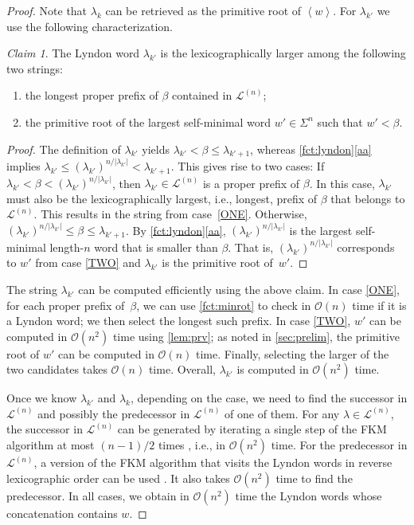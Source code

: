 \documentclass{article}
\newcommand{\Oh}{\mathcal{O}}
\renewcommand{\L}{{\mathcal{L}}}
\newcommand{\minrot}[1]{\left\langle #1 \right\rangle}
\theoremstyle{definition}
\theoremstyle{remark}
\newtheorem*{claim}{Claim}
\begin{document}
\begin{proof}
  Note that $\lambda_k$ can be retrieved as the primitive root of $\minrot{w}$. For $\lambda_{k'}$ we use the following characterization.
    \begin{claim}
      The Lyndon word $\lambda_{k'}$ is the lexicographically larger among the following two strings:
    \begin{enumerate}[label={(\arabic*)}]
    \item\label{ONE} the longest proper prefix of $\beta$ contained in $\L^{(n)}$;
    \item\label{TWO} the primitive root of the largest self-minimal word $w'\in \Sigma^n$ such that $w'<\beta$.
    \end{enumerate}
    \end{claim}
    \begin{proof}
  The definition of $\lambda_{k'}$ yields $\lambda_{k'} < \beta \le \lambda_{k'+1}$, whereas
    \cref{fct:lyndon}\ref{aa} implies $\lambda_{k'} \le (\lambda_{k'})^{n/|\lambda_{k'}|} < \lambda_{k'+1}$.
    This gives rise to two cases:
    If $\lambda_{k'} < \beta < (\lambda_{k'})^{n/|\lambda_{k'}|}$, then $\lambda_{k'} \in \L^{(n)}$ is a proper prefix of $\beta$.
    In this case, $\lambda_{k'}$ must also be the lexicographically largest, i.e., longest, prefix of $\beta$ that belongs to $\L^{(n)}$.
    This results in the string from case~\ref{ONE}.
    Otherwise, $(\lambda_{k'})^{n/|\lambda_{k'}|} \le \beta \le \lambda_{k'+1}$.
    By \cref{fct:lyndon}\ref{aa}, $(\lambda_{k'})^{n/|\lambda_{k'}|}$ is the largest self-minimal length-$n$ word that is smaller than $\beta$.
    That is, $(\lambda_{k'})^{n/|\lambda_{k'}|}$ corresponds to $w'$ from case \ref{TWO} and $\lambda_{k'}$ is the primitive root of~$w'$.
    \end{proof}

  The string $\lambda_{k'}$ can be computed efficiently using the above claim.
  In case \ref{ONE}, for each proper prefix of~$\beta$, we can use \cref{fct:minrot} to check in $\Oh(n)$ time if it is a Lyndon word; we then select the longest such prefix.
  In case \ref{TWO}, $w'$ can be computed in $\Oh(n^2)$ time using \cref{lem:prv}; as noted in \cref{sec:prelim}, the primitive root of $w'$ can be computed in $\Oh(n)$ time.
  Finally, selecting the larger of the two candidates takes $\Oh(n)$ time.
  Overall, $\lambda_{k'}$ is computed in $\Oh(n^2)$ time.

  Once we know $\lambda_{k'}$ and $\lambda_{k}$, depending on the case, we need to find the successor in $\L^{(n)}$
  and possibly the predecessor in $\L^{(n)}$ of one of them. 
  For any $\lambda\in \L^{(n)}$, the successor  in $\L^{(n)}$ can be generated by iterating a single step of the FKM algorithm at most
  $(n-1)/2$ times \cite{FK}, i.e., in $\Oh(n^2)$ time.
  For the predecessor in $\L^{(n)}$, a version of the FKM algorithm that visits the Lyndon words
  in reverse lexicographic order can be used \cite{Knuth}.
  It also takes $\Oh(n^2)$ time to find the predecessor.
  In all cases, we obtain in $\Oh(n^2)$ time the Lyndon words whose concatenation contains $w$.
  

\end{proof}
\end{document}

